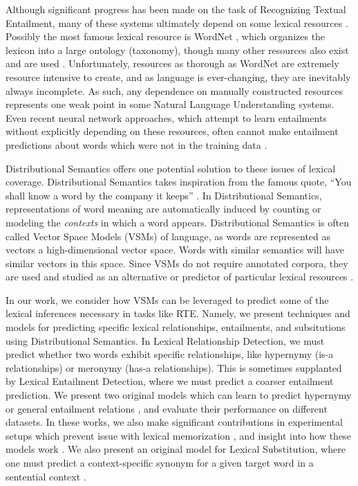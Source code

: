 \documentclass[12pt]{article}
\begin{document}
Although significant progress has been made on the task of Recognizing Textual
Entailment, many of these systems ultimately depend on some lexical resources
\cite{beltagy:2014:semeval,bjerva:2014:semeval,lai:2014:semeval,marelli:2014:semeval,beltagy:2016:cl}.
Possibly the most famous lexical resource is WordNet \cite{miller:1995:acm},
which organizes the lexicon into a large ontology (taxonomy),
though many other resources also exist and are used
\cite{baker:1998:acl,baroni:2011:gems,baroni:2012:eacl,ganitkevitch:2013:naacl,jurgens:2012:semeval,levy:2014:conll,turney:2015:nle}.
Unfortunately, resources as thorough as WordNet are extremely resource
intensive to create, and as language is ever-changing, they are inevitably
always incomplete. As such, any dependence on manually constructed resources
represents one weak point in some Natural Language Understanding systems. Even
recent neural network approaches, which attempt to learn entailments without
explicitly depending on these resources, often cannot make entailment
predictions about words which were not in the training data
\cite{bowman:2015:emnlp,cheng:2016:arxiv}.

Distributional Semantics offers one potential solution to these issues of lexical
coverage. Distributional Semantics takes inspiration from the famous quote,
``You shall know a word by the company it keeps'' \cite{firth:1957:la}. In
Distributional Semantics, representations of word meaning are automatically
induced by counting or modeling the {\em contexts} in which a word appears.
Distributional Semantics is often called Vector Space Models (VSMs) of
language, as words are represented as vectors a high-dimensional vector space.
Words with similar semantics will have similar vectors in this
space. Since VSMs do not require annotated corpora, they are used and
studied as an alternative or predictor of particular lexical resources
\cite{baroni:2012:eacl,erk:2008:emnlp,turney:2010:jair}.

In our work, we consider how VSMs
can be leveraged to predict some of the lexical inferences necessary in tasks
like RTE. Namely, we present techniques and models for predicting specific
lexical relationships, entailments, and subsitutions using Distributional
Semantics. In Lexical Relationship Detection, we must
predict whether two words exhibit specific relationships, like hypernymy (is-a
relationships) or meronymy (has-a relationships). This is sometimes supplanted
by Lexical Entailment Detection, where we must predict a coarser entailment
prediction. We present two original models which can learn to predict hypernymy
or general entailment relations
\cite{roller:2014:coling,beltagy:2016:cl,roller:2016:emnlp}, and evaluate their
performance on different datasets. In these works, we also make significant
contributions in experimental setups which prevent issue with lexical
memorization \cite{roller:2014:coling}, and insight into how these models
work \cite{roller:2016:emnlp}.  We also present an original model for Lexical
Substitution, where one must predict a context-specific synonym for a given
target word in a sentential context \cite{roller:2016:naacl}.
\end{document}
